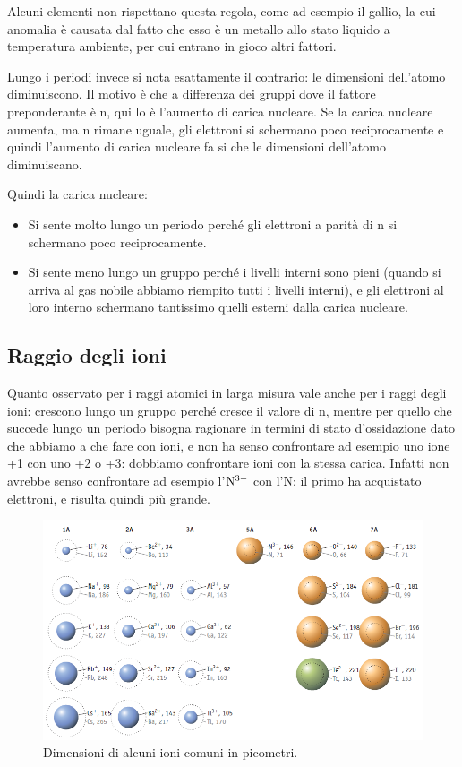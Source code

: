 Alcuni elementi non rispettano questa regola, come ad esempio il gallio, la cui anomalia è causata dal fatto che esso è un metallo allo stato liquido a temperatura ambiente, per cui entrano in gioco altri fattori.

Lungo i periodi invece si nota esattamente il contrario: le dimensioni dell'atomo diminuiscono. Il motivo è che a differenza dei gruppi dove il fattore preponderante è n, qui lo è l'aumento di carica nucleare. Se la carica nucleare aumenta, ma n rimane uguale, gli elettroni si schermano poco reciprocamente e quindi l'aumento di carica nucleare fa si che le dimensioni dell'atomo diminuiscano.

Quindi la carica nucleare:
\begin{itemize}
    \item Si sente molto lungo un periodo perché gli elettroni a parità di n si schermano poco reciprocamente.
    \item Si sente meno lungo un gruppo perché i livelli interni sono pieni (quando si arriva al gas nobile abbiamo riempito tutti i livelli interni), e gli elettroni al loro interno schermano tantissimo quelli esterni dalla carica nucleare.
\end{itemize}
\subsection{Raggio degli ioni}
Quanto osservato per i raggi atomici in larga misura vale anche per i raggi degli ioni: crescono lungo un gruppo perché cresce il valore di n, mentre per quello che succede lungo un periodo bisogna ragionare in termini di stato d'ossidazione dato che abbiamo a che fare con ioni, e non ha senso confrontare ad esempio uno ione +1 con uno +2 o +3: dobbiamo confrontare ioni con la stessa carica. Infatti non avrebbe senso confrontare ad esempio l'$\rm N^{3-}$ con l'N: il primo ha acquistato elettroni, e risulta quindi più grande.

\begin{figure}[H]
    \centering
    \includegraphics[width=13cm]{immagini/raggi-ionici.png}
    \caption*{Dimensioni di alcuni ioni comuni in picometri.}
\end{figure}

